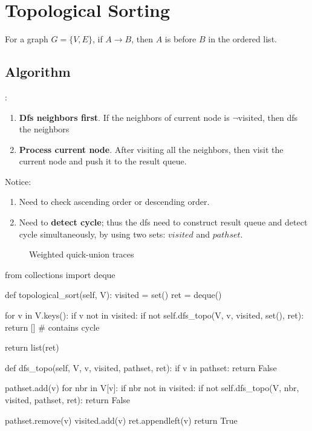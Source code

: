 \section{Topological Sorting}
For a graph $G=\{V, E\}$, if $A \rightarrow B $, then $A$ is before $B$ in the ordered list. 
\subsection{Algorithm}
:
\begin{enumerate}
\item \textbf{Dfs neighbors first}. If the neighbors of current node is  $\neg$visited, then dfs the neighbors
\item \textbf{Process current node}. After visiting all the neighbors, then visit the current node and push it to the result queue.

\end{enumerate}
Notice:
\begin{enumerate}
\item Need to check ascending order or descending order. 
\item Need to \textbf{detect cycle}; thus the dfs need to construct result queue and detect cycle simultaneously, by using two sets: $visited$ and $pathset$. 
\end{enumerate}
\begin{figure}[hbtp]
\centering
\subfloat{\texttt{[image: uf]}}
\caption{Weighted quick-union traces}
\label{fig:union_find}
\end{figure}
\newpage
\begin{python}
from collections import deque

def topological_sort(self, V):
  visited = set()
  ret = deque()

  for v in V.keys():
    if v not in visited:
      if not self.dfs_topo(V, v, visited, set(), ret):
        return []  # contains cycle 

  return list(ret)

def dfs_topo(self, V, v, visited, pathset, ret):
  if v in pathset:
    return False

  pathset.add(v)
  for nbr in V[v]:
    if nbr not in visited:
      if not self.dfs_topo(V, nbr, visited, pathset, ret):
        return False

  pathset.remove(v)
  visited.add(v)
  ret.appendleft(v)
  return True

\end{python}

